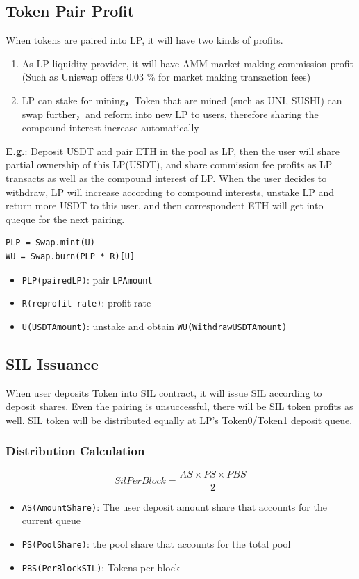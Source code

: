 \documentclass[11pt,letterpaper]{article}
\begin{document}
\begin{multicols}{2}
\subsection{Token Pair Profit}

When tokens are paired into LP, it will have two kinds of profits.
\begin{enumerate}
  \item As LP liquidity provider, it will have AMM market making commission profit (Such as Uniswap offers  0.03 \% for market making transaction fees)
  \item LP can stake for mining，Token that are mined (such as UNI, SUSHI) can swap further，and reform into new LP to users, therefore sharing the compound interest increase automatically
\end{enumerate}

\textbf{E.g.}: Deposit USDT and pair ETH in the pool as LP, then the user will share partial ownership of this LP(USDT), and share commission fee profits as LP transacts as well as the compound interest of LP. When the user decides to withdraw, LP will increase according to compound interests, unstake LP and return more USDT to this user, and then correspondent ETH will get into queque for the next pairing.

\begin{verbatim}
PLP = Swap.mint(U)
WU = Swap.burn(PLP * R)[U]
\end{verbatim}
\begin{itemize}
    \item \texttt{PLP(pairedLP)}: pair \texttt{LPAmount}
    \item \texttt{R(reprofit rate)}: profit rate
    \item \texttt{U(USDTAmount)}: unstake and obtain \texttt{WU(WithdrawUSDTAmount)}
\end{itemize}

\subsection{SIL Issuance}
When user deposits Token into SIL contract, it will issue SIL according to deposit shares. Even the pairing is unsuccessful, there will be SIL token profits as well. SIL token will be distributed equally at LP's Token0/Token1 deposit queue.

\subsubsection{Distribution Calculation}
\[ SilPerBlock = \frac{AS \times PS \times PBS}{2} \]
\begin{itemize}
    \item \texttt{AS(AmountShare)}: The user deposit amount share that accounts for the current queue
    \item \texttt{PS(PoolShare)}: the pool share that accounts for the total pool
    \item \texttt{PBS(PerBlockSIL)}: Tokens per block
\end{itemize}


\end{multicols}
\end{document}
